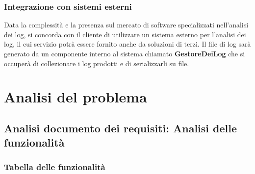 \documentclass[12pt,a4paper]{report}
\begin{document}
\subsection{Integrazione con sistemi esterni}
Data la complessità e la presenza sul mercato di software specializzati nell'analisi dei log, si concorda con il cliente di utilizzare un sistema esterno per l'analisi dei log, il cui servizio potrà essere fornito anche da soluzioni di terzi.
Il file di log sarà generato da un componente interno al sistema chiamato \textbf{GestoreDeiLog} che si occuperà di collezionare i log prodotti e di serializzarli su file.

\newpage
\chapter{Analisi del problema}

\section{Analisi documento dei requisiti: Analisi delle funzionalità}

\subsection{Tabella delle funzionalità}
\end{document}

